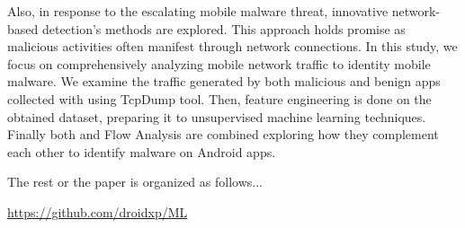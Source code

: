 Also, in response to the escalating mobile malware threat, innovative network-based detection's methods are explored. This approach holds promise as malicious activities often manifest through network connections. In this study, we focus on comprehensively analyzing mobile network traffic to identity mobile malware. We examine the traffic generated by both malicious and benign apps collected with \droidxp using TcpDump tool. Then, feature engineering is done on the obtained dataset, preparing it to unsupervised machine learning techniques. Finally both \mas and Flow Analysis are combined exploring how they complement each other to identify malware on Android apps.

The rest or the paper is organized as follows...

\begin{small}
  \begin{center}
    \url{https://github.com/droidxp/ML}
  \end{center}
\end{small}

